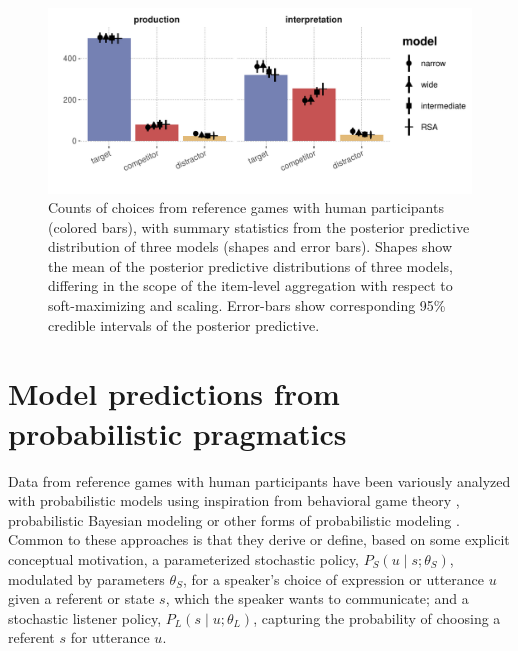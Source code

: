 \documentclass[fleqn]{article}
\begin{document}
\begin{figure}
  \centering

    \includegraphics[width=0.9\linewidth]{00-pics/PPC-alpha-eps-model.pdf}

    \caption{Counts of choices from reference games with human participants (colored bars), with summary statistics from the posterior predictive distribution of three models (shapes and error bars).
      Shapes show the mean of the posterior predictive distributions of three models, differing in the scope of the item-level aggregation with respect to soft-maximizing and scaling.
      Error-bars show corresponding 95\% credible intervals of the posterior predictive.
    }
  \label{fig:refgame-counts}
\end{figure}


\section{Model predictions from probabilistic pragmatics}
\label{sec:model-pred-from}

Data from reference games with human participants have been variously analyzed with probabilistic models using inspiration from behavioral game theory \citep[e.g.,][]{DegenFranke2013:Cost-Based-Prag,QingFranke2013:Variations-on-a}, probabilistic Bayesian modeling \citep[e.g.,][]{FrankGoodman2012:Predicting-Prag,FrankeDegen2015:Reasoning-in-Re} or other forms of probabilistic modeling \citep[e.g.,][]{GattGompel2013:Are-we-Bayesian}.
Common to these approaches is that they derive or define, based on some explicit conceptual motivation, a parameterized stochastic policy, $P_{S}(u \mid s; \theta_{S})$, modulated by parameters $\theta_{S}$, for a speaker's choice of expression or utterance $u$ given a referent or state $s$, which the speaker wants to communicate;
and a stochastic listener policy, $P_{L}(s \mid u; \theta_{L})$, capturing the probability of choosing a referent $s$ for utterance $u$.
\end{document}
